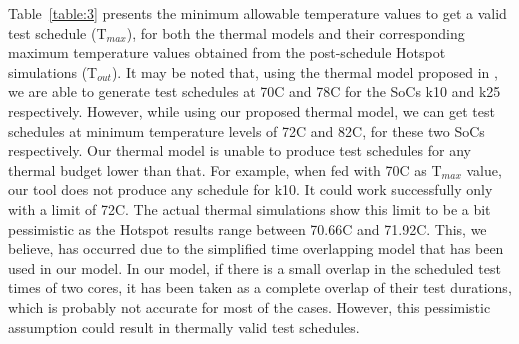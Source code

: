 \documentclass[conference]{IEEEtran}
\begin{document}
	\par
	Table~\ref{table:3} presents the minimum allowable temperature
values to get a valid test schedule (T$_{max}$), for both the thermal
models and their corresponding maximum temperature values
obtained from the post-schedule Hotspot simulations (T$_{out}$).
It may be noted that, using the thermal model proposed in
\cite{yao2011power}, we are able to generate test schedules at 70\degree C and 78\degree C for
the SoCs k10 and k25 respectively. However, while using
our proposed thermal model, we can get test schedules at
minimum temperature levels of 72\degree C and 82\degree C, for these two
SoCs respectively. Our thermal model is unable to produce test
schedules for any thermal budget lower than that. For example,
when fed with 70\degree C as T$_{max}$ value, our tool does not produce
any schedule for k10. It could work successfully only with a
limit of 72\degree C. The actual thermal simulations show this limit
to be a bit pessimistic as the Hotspot results range between
70.66\degree C and 71.92\degree C. This, we believe, has occurred due to
the simplified time overlapping model that has been used in our
model. In our model, if there is a small overlap in the scheduled
test times of two cores, it has been taken as a complete overlap
of their test durations, which is probably not accurate for most
of the cases. However, this pessimistic assumption could result
in thermally valid test schedules.
\end{document}
